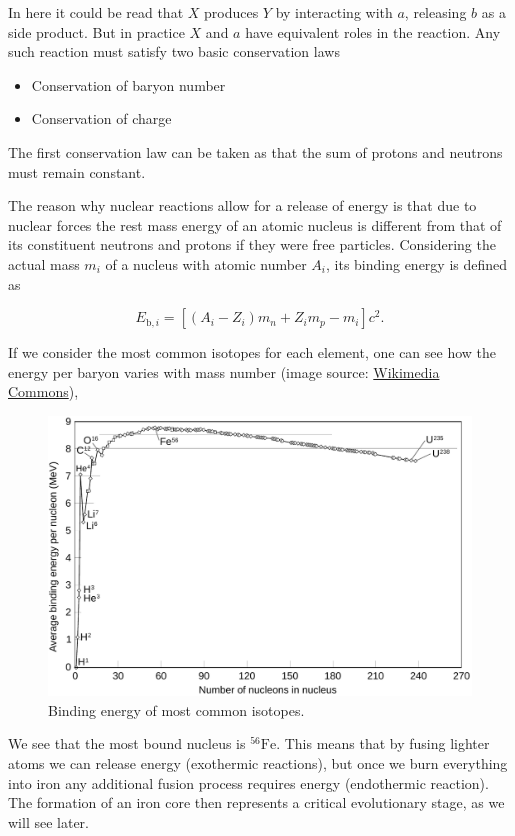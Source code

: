 \documentclass[twocolumn]{article}
\providecommand{\tightlist}{%
  \setlength{\itemsep}{0pt}\setlength{\parskip}{0pt}}
\begin{document}
In here it could be read that \(X\) produces \(Y\) by interacting with
\(a\), releasing \(b\) as a side product. But in practice \(X\) and
\(a\) have equivalent roles in the reaction. Any such reaction must
satisfy two basic conservation laws

\begin{itemize}
\tightlist
\item
  Conservation of baryon number
\item
  Conservation of charge
\end{itemize}

The first conservation law can be taken as that the sum of protons and
neutrons must remain constant.

The reason why nuclear reactions allow for a release of energy is that
due to nuclear forces the rest mass energy of an atomic nucleus is
different from that of its constituent neutrons and protons if they were
free particles. Considering the actual mass \(m_i\) of a nucleus with
atomic number \(A_i\), its binding energy is defined as

\[E_{\mathrm{b},i}=[(A_i-Z_i)m_n + Z_i m_p - m_i]c^2.\]

If we consider the most common isotopes for each element, one can see
how the energy per baryon varies with mass number (image source:
\href{https://commons.wikimedia.org/wiki/File:Binding_energy_curve_-_common_isotopes.pdf}{Wikimedia
Commons}),

\begin{figure}
\centering
\includegraphics{../assets/7_nucleo1/binding.pdf}
\caption{Binding energy of most common isotopes.}
\end{figure}

We see that the most bound nucleus is \(^{56}\mathrm{Fe}\). This means
that by fusing lighter atoms we can release energy (exothermic
reactions), but once we burn everything into iron any additional fusion
process requires energy (endothermic reaction). The formation of an iron
core then represents a critical evolutionary stage, as we will see
later.
\end{document}
